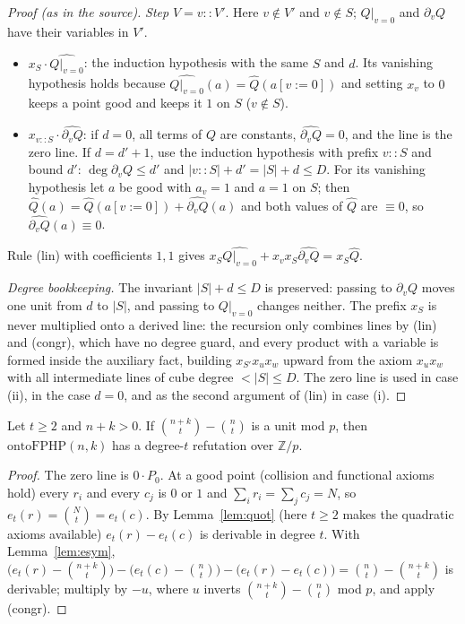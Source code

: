 \begin{proof}[Proof (as in the source)]
\emph{Step} $V=v::V'$.  Here $v\notin V'$ and $v\notin S$; $Q|_{v=0}$ and $\partial_vQ$ have their
variables in $V'$.
\begin{itemize}
\item $x_S\cdot\widehat{Q|_{v=0}}$: the induction hypothesis with the same $S$ and $d$.  Its
vanishing hypothesis holds because $\widehat{Q|_{v=0}}(a)=\hat Q(a[v:=0])$ and setting $x_v$
to $0$ keeps a point good and keeps it $1$ on $S$ ($v\notin S$).
\item $x_{v::S}\cdot\widehat{\partial_vQ}$: if $d=0$, all terms of $Q$ are constants,
$\widehat{\partial_vQ}=0$, and the line is the zero line.  If $d=d'+1$, use the induction
hypothesis with prefix $v::S$ and bound $d'$: $\deg\partial_vQ\le d'$ and
$|v::S|+d'=|S|+d\le D$.  For its vanishing hypothesis let $a$ be good with $a_v=1$ and
$a=1$ on $S$; then $\hat Q(a)=\hat Q(a[v:=0])+\widehat{\partial_vQ}(a)$ and both values of
$\hat Q$ are $\equiv0$, so $\widehat{\partial_vQ}(a)\equiv0$.
\end{itemize}
Rule (lin) with coefficients $1,1$ gives $x_S\widehat{Q|_{v=0}}+x_vx_S\widehat{\partial_vQ}=x_S\hat Q$.

\emph{Degree bookkeeping.}  The invariant $|S|+d\le D$ is preserved: passing to
$\partial_vQ$ moves one unit from $d$ to $|S|$, and passing to $Q|_{v=0}$ changes neither.
The prefix $x_S$ is never multiplied onto a derived line: the recursion only combines lines
by (lin) and (congr), which have no degree guard, and every product with a variable is
formed inside the auxiliary fact, building $x_{S'}x_ux_w$ upward from the axiom $x_ux_w$
with all intermediate lines of cube degree $<|S|\le D$.  The zero line is used in case (ii),
in the case $d=0$, and as the second argument of (lin) in case (i).

\end{proof}

\begin{proposition}\label{prop:A-upper}
Let $t\ge2$ and $n+k>0$.  If $\binom{n+k}t-\binom nt$ is a unit mod $p$, then
$\mathrm{ontoFPHP}(n,k)$ has a degree-$t$ refutation over
$\mathbb Z/p$.
\end{proposition}

\begin{proof}
The zero line is $0\cdot P_0$.  At a good point (collision and functional axioms
hold) every $r_i$ and every $c_j$ is $0$ or $1$ and $\sum_ir_i=\sum_jc_j=N$, so
$e_t(r)=\binom Nt=e_t(c)$.  By
Lemma~\ref{lem:quot} (here $t\ge2$ makes the quadratic axioms available)
$e_t(r)-e_t(c)$ is derivable in degree $t$.  With Lemma~\ref{lem:esym},
$\bigl(e_t(r)-\binom{n+k}t\bigr)-\bigl(e_t(c)-\binom nt\bigr)-\bigl(e_t(r)-e_t(c)\bigr)
=\binom nt-\binom{n+k}t$ is derivable; multiply by $-u$, where $u$ inverts
$\binom{n+k}t-\binom nt$ mod $p$, and apply (congr).
\end{proof}

